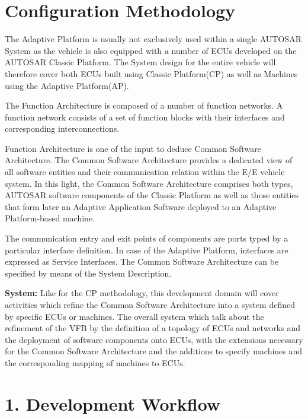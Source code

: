 \hypertarget{adaptive_configurationmethodology}{}\section{Configuration Methodology}\label{adaptive_configurationmethodology}
The Adaptive Platform is usually not exclusively used within a single A\+U\+T\+O\+S\+AR System as the vehicle is also equipped with a number of E\+C\+Us developed on the A\+U\+T\+O\+S\+AR Classic Platform. The System design for the entire vehicle will therefore cover both E\+C\+Us built using Classic Platform(\+C\+P) as well as Machines using the Adaptive Platform(\+A\+P).


\begin{DoxyItemize}
\item The Function Architecture is composed of a number of function networks. A function network consists of a set of function blocks with their interfaces and corresponding interconnections.
\item Function Architecture is one of the input to deduce Common Software Architecture. The Common Software Architecture provides a dedicated view of all software entities and their communication relation within the E/E vehicle system. In this light, the Common Software Architecture comprises both types, A\+U\+T\+O\+S\+AR software components of the Classic Platform as well as those entities that form later an Adaptive Application Software deployed to an Adaptive Platform-\/based machine.
\item The communication entry and exit points of components are ports typed by a particular interface definition. In case of the Adaptive Platform, interfaces are expressed as Service Interfaces. The Common Software Architecture can be specified by means of the System Description.
\end{DoxyItemize}

 {\bfseries System\+:} Like for the CP methodology, this development domain will cover activities which refine the Common Software Architecture into a system defined by specific E\+C\+Us or machines. The overall system which talk about the refinement of the V\+FB by the definition of a topology of E\+C\+Us and networks and the deployment of software components onto E\+C\+Us, with the extensions necessary for the Common Software Architecture and the additions to specify machines and the corresponding mapping of machines to E\+C\+Us.

\section*{1. Development Workflow}



